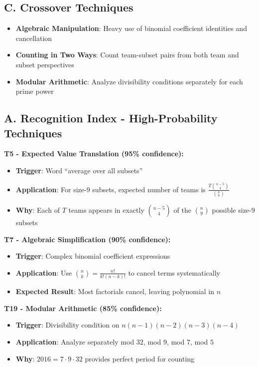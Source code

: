 \documentclass[]{article}
\begin{document}
\begin{tacticalbox}
		\subsection*{C. Crossover Techniques}
		\begin{itemize}[leftmargin=*]
			\item \textbf{Algebraic Manipulation}: Heavy use of binomial coefficient identities and cancellation
			\item \textbf{Counting in Two Ways}: Count team-subset pairs from both team and subset perspectives
			\item \textbf{Modular Arithmetic}: Analyze divisibility conditions separately for each prime power
		\end{itemize}
	\end{tacticalbox}
	
	\begin{techniquesbox}
		\subsection*{A. Recognition Index - High-Probability Techniques}
		
		\textbf{T5 - Expected Value Translation (95\% confidence):}
		\begin{itemize}[nosep]
			\item \textbf{Trigger}: Word ``average over all subsets''
			\item \textbf{Application}: For size-9 subsets, expected number of teams is $\frac{T \binom{n-5}{4}}{\binom{n}{9}}$
			\item \textbf{Why}: Each of $T$ teams appears in exactly $\binom{n-5}{4}$ of the $\binom{n}{9}$ possible size-9 subsets
		\end{itemize}
		
		\textbf{T7 - Algebraic Simplification (90\% confidence):}
		\begin{itemize}[nosep]
			\item \textbf{Trigger}: Complex binomial coefficient expressions
			\item \textbf{Application}: Use $\binom{n}{k} = \frac{n!}{k!(n-k)!}$ to cancel terms systematically
			\item \textbf{Expected Result}: Most factorials cancel, leaving polynomial in $n$
		\end{itemize}
		
		\textbf{T19 - Modular Arithmetic (85\% confidence):}
		\begin{itemize}[nosep]
			\item \textbf{Trigger}: Divisibility condition on $n(n-1)(n-2)(n-3)(n-4)$
			\item \textbf{Application}: Analyze separately mod $32$, mod $9$, mod $7$, mod $5$
			\item \textbf{Why}: $2016 = 7 \cdot 9 \cdot 32$ provides perfect period for counting
		\end{itemize}
		

\end{techniquesbox}
\end{document}
